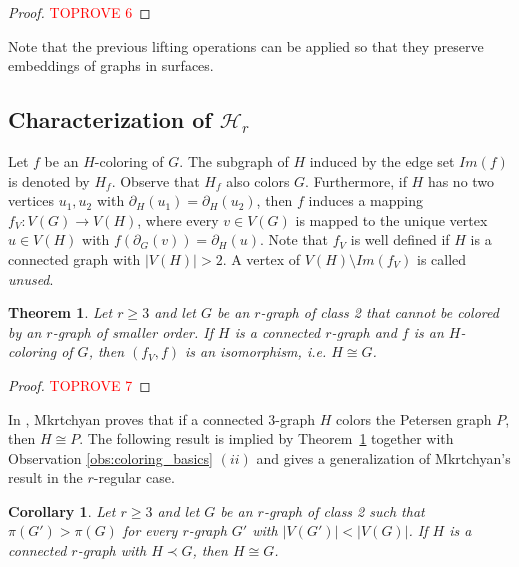 \documentclass[a4paper,11pt]{article}
\newcommand{\ca}{\mathcal}
\newtheorem{theo}[defi]{Theorem}
\newtheorem{cor}[defi]{Corollary}
\theoremstyle{remark}
\begin{document}
\begin{proof}\textcolor{red}{TOPROVE 6}\end{proof}

Note that the previous lifting operations can be applied so that they preserve embeddings of graphs in surfaces.

\subsection{Characterization of $\ca H_r$}


Let $ f$ be an $ H $-coloring of $ G $.
The subgraph of $H$ induced by the edge set $Im(f)$ is denoted by $H_f$. Observe that $H_f$ also colors $G$. Furthermore, if $H$ has no two vertices $u_1,u_2$ with $\partial_H(u_1)=\partial_H(u_2)$, then $f$ induces a mapping $f_V\colon V(G) \to V(H)$, where every $v \in V(G)$ is mapped to the unique vertex $u \in V(H)$ with $f(\partial_G(v))=\partial_H(u)$. Note that $f_V$ is well defined if $H$ is a connected graph with $|V(H)|>2$. A vertex of $V(H)\setminus Im(f_V)$ is called \emph{unused}.






\begin{theo}
\label{theo:coloring_graphs_in_S(r,k)_generalisation}
Let $r \geq 3$ and let $G$ be an $r$-graph of class 2 that cannot be colored by an $r$-graph of smaller order. If $H$ is a connected $r$-graph and $f$ is an $H$-coloring of $G$, then $(f_V,f)$ is an isomorphism, i.e. $H \cong G$.
\end{theo}

\begin{proof}\textcolor{red}{TOPROVE 7}\end{proof}

In \cite{Mkrtchyan_Pet_col}, Mkrtchyan proves that if a connected $3$-graph $H$ colors the Petersen graph $P$, then $H\cong P$. The following result is implied by Theorem~\ref{theo:coloring_graphs_in_S(r,k)_generalisation} together with Observation \ref{obs:coloring_basics} $(ii)$ and  gives a generalization of Mkrtchyan's result in the $r$-regular case.

\begin{cor}
\label{cor:coloring_graphs_in_S(r,k)}
Let $r \geq 3$ and let $G$ be an $r$-graph of class 2 such that $\pi(G')>\pi(G)$ for every $r$-graph $G'$ with $|V(G')|<|V(G)|$. If $H$ is a connected $r$-graph with $H \prec G$, then $H \cong G$.
\end{cor}
\end{document}
